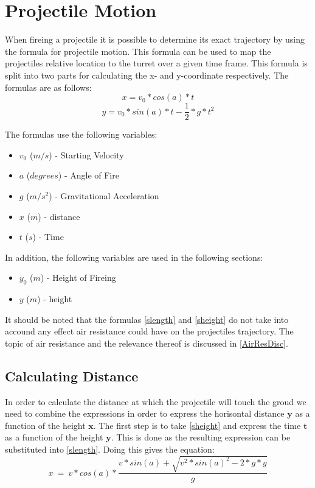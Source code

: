 \section{Projectile Motion}\label{ProjMotion}
When fireing a projectile it is possible to determine its exact trajectory by
using the formula for projectile motion. This formula can be used to map the
projectiles relative location to the turret over a given time frame. This
formula is split into two parts for calculating the x- and y-coordinate
respectively. The formulas are as follows:
\begin{equation}\label{slength}
x=v_0*cos(a)*t
\end{equation}
\begin{equation}\label{sheight}
y=v_0*sin(a)*t-\frac{1}{2}*g*t^2
\end{equation}

The formulas use the following variables:
\begin{itemize}
  \item $v_0$ ($m/s$) - Starting Velocity 
  \item $a$ ($degrees$) - Angle of Fire 
  \item $g$ ($m/s^2$) - Gravitational Acceleration 
  \item $x$ ($m$) - distance
  \item $t$ ($s$) - Time
\end{itemize}
In addition, the following variables are used in the following sections:
\begin{itemize}
  \item $y_0$ ($m$) - Height of Fireing 
  \item $y$ ($m$) - height
\end{itemize}

It should be noted that the formulas \autoref{slength} and \autoref{sheight} do
not take into accound any effect air resistance could have on the projectiles
trajectory. The topic of air resistance and the relevance thereof is discussed
in \autoref{AirResDisc}.

\subsection{Calculating Distance}\label{CalcDist}
In order to calculate the distance at which the projectile will touch the groud
we need to combine the expressions in order to express the horisontal distance
$\textbf{y}$ as a function of the height $\textbf{x}$. The first step is to take
\autoref{sheight} and express the time $\textbf{t}$ as a function of the
height $\textbf{y}$. This is done as the resulting expression can
be substituted into \autoref{slength}. Doing this gives the equation:
\begin{equation}\label{FinEq}
x\ =\ v*cos(a)*\frac{v*sin(a)+\sqrt{v^2*sin(a)^2-2*g*y}}{g}
\end{equation}

